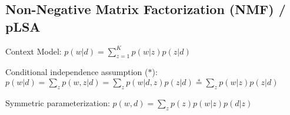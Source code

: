 \documentclass[a4paper, 11pt, landscape]{article}
\begin{document}
\begin{multicols*}{3}




\section{Non-Negative Matrix Factorization (NMF) / pLSA}
\begin{compactitem}
	\item Context Model: $p(w | d) = \sum_{z=1}^K p(w | z) p(z | d)$
	\item Conditional independence assumption ($*$): $p(w|d) = \sum_z p(w,z|d) = \sum_z p(w|d,z)p(z|d) \stackrel{*}{=} \sum_z p(w|z)p(z|d)$ 
	\item Symmetric parameterization: $p(w, d) = \sum_z p(z)p(w | z) p(d | z)$
\end{compactitem}


\end{multicols*}
\end{document}
